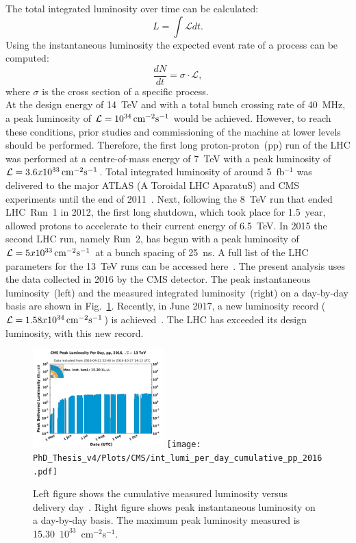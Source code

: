 The total integrated luminosity over time can be calculated:
\begin{equation}
  \label{eqn:Lum}
  L = \int \mathcal{L} dt.
\end{equation}
Using the instantaneous luminosity the expected event rate of a process can be computed:
\begin{equation}
  \label{eqn:Eventrate}
  \frac{dN}{dt} = \sigma \cdot \mathcal{L},
\end{equation}
where $\sigma$ is the cross section of a specific process.\\
At the design energy of 14~TeV and with a total bunch crossing rate of 40~MHz, a peak luminosity of $\mathcal{L}=10^{34}\,{\rm cm^{-2}s^{-1}}$ would be achieved. However, to reach these conditions, prior studies and commissioning of the machine at lower levels should be performed. Therefore, the first long proton-proton~(pp) run of the LHC was performed at a centre-of-mass energy of 7~TeV with a peak luminosity of $\mathcal{L}=3.6 x 10^{33}\,{\rm cm^{-2}s^{-1}}$. Total integrated luminosity of around 5~fb$^{-1}$ was delivered to the major ATLAS (A Toroidal LHC AparatuS) and CMS experiments until the end of 2011~\cite{lumi5}.
Next, following the 8~TeV run that ended LHC~Run~1 in 2012, the first long shutdown, which took place for 1.5~year, allowed protons to accelerate to their current energy of 6.5~TeV. In 2015 the second LHC run, namely Run~2, has begun with a peak luminosity of $\mathcal{L}=5 x 10^{33}\,{\rm cm^{-2}s^{-1}}$ at a bunch spacing of 25~ns.
A full list of the LHC parameters for the 13~TeV runs can be accessed here~\cite{LHC_param}. The present analysis uses the data collected in 2016 by the CMS detector. The peak instantaneous luminosity~(left) and the measured integrated luminosity~(right) on a day-by-day basis are shown in Fig.~\ref{fig:peaklumi_IntLumi}. Recently, in June 2017, a new luminosity record ($\mathcal{L}=1.58 x 10^{34}\,{\rm cm^{-2}s^{-1}}$) is achieved~\cite{LHC_record}. The LHC has exceeded its design luminosity, with this new record.
\begin{figure}
    \centering
    \includegraphics[width=0.45\textwidth]{Plots/CMS/peak_lumi_per_day_pp_2016_log.pdf}
    \texttt{[image: PhD\_Thesis\_v4/Plots/CMS/int\_lumi\_per\_day\_cumulative\_pp\_2016.pdf]}
    \caption[Instantaneous and integrated luminosity recorded by CMS detector]{Left figure shows the cumulative measured luminosity versus delivery day~\cite{pileupCMS}. Right figure shows peak instantaneous luminosity on a day-by-day basis. The maximum peak luminosity measured is 15.30~$10^{33}$~cm$^{-2}$s$^{-1}$.}
    \label{fig:peaklumi_IntLumi}
\end{figure}
